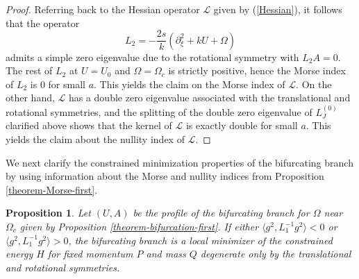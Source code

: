 \documentclass[12pt,reqno]{amsart}
\numberwithin{equation}{section}
\newtheorem{proposition}{Proposition}
\begin{document}
\begin{proof}
Referring back to the Hessian operator $\mathcal{L}$ given by (\ref{Hessian}), it follows that 
the operator 
$$
L_2 = -\frac{2s}{k} (\partial_{\xi}^2 + k U + \Omega)
$$ 
admits a simple zero eigenvalue due to the rotational symmetry with $L_2 A = 0$. The rest of $L_2$ at $U = U_0$ and $\Omega = \Omega_c$ is strictly positive, 
hence the Morse index of $L_2$ is $0$ for small $a$. This yields the claim on the Morse index of $\mathcal{L}$.
On the other hand, $\mathcal{L}$ has a double zero eigenvalue associated with the translational and rotational symmetries, and the splitting 
of the double zero eigenvalue of $L_J^{(0)}$ clarified above shows that the kernel of $\mathcal{L}$ is exactly double for small $a$. This yields the 
claim about the nullity index of $\mathcal{L}$.
\end{proof}

We next clarify the constrained minimization properties of the bifurcating branch by using information about 
the Morse and nullity indices from Proposition \ref{theorem-Morse-first}.

\begin{proposition}
    \label{theorem-stability-first}
    Let $(U,A)$ be the profile of the bifurcating branch for $\Omega$ near $\Omega_c$ given by Proposition \ref{theorem-bifurcation-first}. 
If either $\langle g^2, L_1^{-1} g^2 \rangle < 0$ or $\langle g^2, L_1^{-1} g^2 \rangle > 0$, the bifurcating branch is a local minimizer of the constrained energy $H$ for fixed momentum $P$ and mass $Q$ degenerate only by the translational and rotational symmetries. 
\end{proposition}
\end{document}
